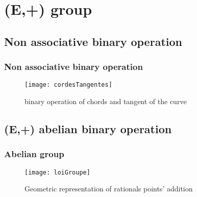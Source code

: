 \section{(E,+) group}

\subsection{Non associative binary operation}
\begin{frame}[t]
    \frametitle{Non associative binary operation}
    
    \begin{figure}[h]
        \centering
        \texttt{[image: cordesTangentes]}
        \caption{binary operation of chords and tangent of the curve}
        \label{fig:cordesTangentes}
    \end{figure}
\end{frame}

\subsection{(E,+) abelian binary operation}
\begin{frame}[t]
    \frametitle{Abelian group}
    \begin{figure}[h]
        \centering
        \texttt{[image: loiGroupe]}
        \caption{Geometric representation of rationals points' addition}
        \label{fig:loiGroupe}
    \end{figure}
\end{frame}
